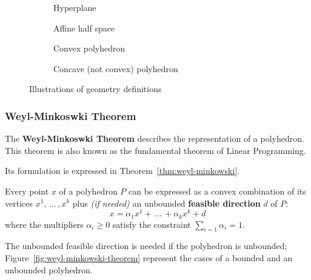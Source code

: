\documentclass[english]{article}
\begin{document}
\begin{figure}[htbp]
  \bigskip
  \centering
  \begin{subfigure}[b]{0.495\textwidth}
    \centering
    \bigskip
    \caption{Hyperplane}
    \label{subfig:hyperplane}
    \bigskip
  \end{subfigure}
  \bigskip
  \begin{subfigure}[b]{0.495\textwidth}
    \centering
    \bigskip
    \caption{Affine half space}
    \label{subfig:affine-half-space}
    \bigskip
  \end{subfigure}
  \begin{subfigure}[h]{0.495\textwidth}
    \centering
    \bigskip
    \caption{Convex polyhedron}
    \label{subfig:convex-hull}
    \bigskip
  \end{subfigure}
  \begin{subfigure}[h]{0.495\textwidth}
    \centering
    \bigskip
    \caption{Concave (not convex) polyhedron}
    \label{subfig:not-convex-hull}
    \bigskip
  \end{subfigure}
  \caption{Illustrations of \LP geometry definitions}
  \label{fig:lp-geometry}
  \bigskip
\end{figure}

\subsubsection{Weyl-Minkoswki Theorem}

The \textbf{Weyl-Minkoswki Theorem} describes the representation of a polyhedron.
This theorem is also known as the fundamental theorem of Linear Programming.

Its formulation is expressed in Theorem~\ref{thm:weyl-minkowski}.

\begin{theorem}
  Every point \(x\) of a polyhedron \(P\) can be expressed as a convex combination of its vertices \(x^1, \, \ldots \,, x^k\) plus \textit{(if needed)} an unbounded \textbf{feasible direction} \(d\) of \(P\):
  \[ x = \alpha_1 x^1 + \, \ldots \, + \alpha_k x^k + d \]
  where the multipliers \(\alpha_i \geq 0\) satisfy the constraint \(\displaystyle\sum_{i=1} \alpha_i = 1\).
  \label{thm:weyl-minkowski}
\end{theorem}

\bigskip
The unbounded feasible direction is needed if the polyhedron is unbounded; Figure~\ref{fig:weyl-minkowski-theorem} represent the cases of a bounded and an unbounded polyhedron.
\end{document}
